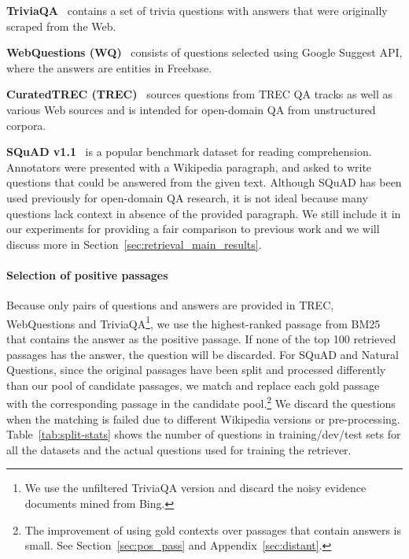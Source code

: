 \documentclass[11pt,a4paper]{article}
\begin{document}
\noindent
\textbf{TriviaQA}~\cite{joshi-etal-2017-triviaqa} contains a set of trivia questions with answers that were originally scraped from the Web.

\noindent
\textbf{WebQuestions (WQ)}~\cite{berant2013semantic} consists of questions selected using Google Suggest API, where the answers are entities in Freebase.

\noindent
\textbf{CuratedTREC (TREC)}~\cite{baudivs2015modeling} sources questions from TREC QA tracks as well as various Web sources
and is intended for open-domain QA from unstructured corpora.

\noindent
\textbf{SQuAD v1.1}~\cite{rajpurkar2016squad} is a popular benchmark dataset for reading comprehension.
Annotators were presented with a Wikipedia paragraph, and asked to write questions that could be answered from the given text.
Although SQuAD has been used previously for open-domain QA research, it is not ideal because many questions lack context in absence of the provided paragraph.
We still include it in our experiments for providing a fair comparison to previous work and we will discuss more in Section~\ref{sec:retrieval_main_results}.


\paragraph{Selection of positive passages} 

Because only pairs of questions and answers are provided in TREC, WebQuestions and TriviaQA\footnote{We use the unfiltered TriviaQA version and discard the noisy evidence documents mined from Bing.}, we use the highest-ranked passage from BM25 that contains the answer as the positive passage.  If none of the top 100 retrieved passages has the answer, the question will be discarded.
For SQuAD and Natural Questions, since the original passages have been split and processed differently than our pool of candidate passages, we match and replace each gold passage with the corresponding passage in the candidate pool.\footnote{The improvement of using gold contexts over passages that contain answers is small. See Section~\ref{sec:pos_pass} and Appendix~\ref{sec:distant}.}
We discard the questions when the matching is failed due to different Wikipedia versions or pre-processing.
Table~\ref{tab:split-stats} shows the number of questions in training/dev/test sets for all the datasets and the actual questions used for training the retriever.
\end{document}
